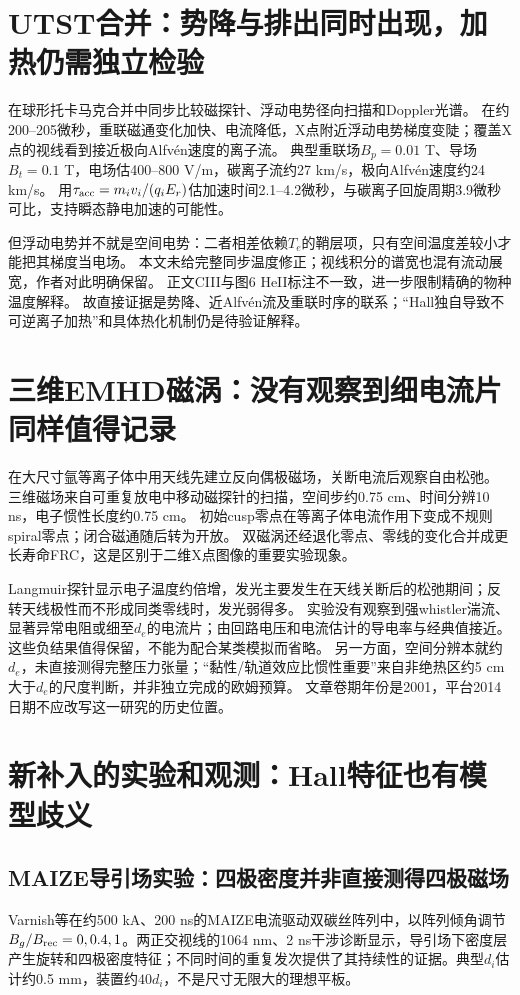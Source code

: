 \documentclass[UTF8,a4paper,11pt,openany,fontset=fandol]{ctexbook}
\begin{document}
\section{UTST合并：势降与排出同时出现，加热仍需独立检验}
\citet{L189}在球形托卡马克合并中同步比较磁探针、浮动电势径向扫描和Doppler光谱。
在约200--205微秒，重联磁通变化加快、电流降低，X点附近浮动电势梯度变陡；覆盖X点的视线看到接近极向Alfvén速度的离子流。
典型重联场$B_p=0.01$ T、导场$B_t=0.1$ T，电场估400--800 V/m，碳离子流约27 km/s，极向Alfvén速度约24 km/s。
用$\tau_{\rm acc}=m_iv_i/(q_iE_r)$估加速时间2.1--4.2微秒，与碳离子回旋周期3.9微秒可比，支持瞬态静电加速的可能性。

但浮动电势并不就是空间电势：二者相差依赖$T_e$的鞘层项，只有空间温度差较小才能把其梯度当电场。
本文未给完整同步温度修正；视线积分的谱宽也混有流动展宽，作者对此明确保留。
正文CIII与图6 HeII标注不一致，进一步限制精确的物种温度解释。
故直接证据是势降、近Alfvén流及重联时序的联系；“Hall独自导致不可逆离子加热”和具体热化机制仍是待验证解释。

\section{三维EMHD磁涡：没有观察到细电流片同样值得记录}
\citet{F766}在大尺寸氩等离子体中用天线先建立反向偶极磁场，关断电流后观察自由松弛。
三维磁场来自可重复放电中移动磁探针的扫描，空间步约0.75 cm、时间分辨10 ns，电子惯性长度约0.75 cm。
初始cusp零点在等离子体电流作用下变成不规则spiral零点；闭合磁通随后转为开放。
双磁涡还经退化零点、零线的变化合并成更长寿命FRC，这是区别于二维X点图像的重要实验现象。

Langmuir探针显示电子温度约倍增，发光主要发生在天线关断后的松弛期间；反转天线极性而不形成同类零线时，发光弱得多。
实验没有观察到强whistler湍流、显著异常电阻或细至$d_e$的电流片；由回路电压和电流估计的导电率与经典值接近。
这些负结果值得保留，不能为配合某类模拟而省略。
另一方面，空间分辨本就约$d_e$，未直接测得完整压力张量；“黏性/轨道效应比惯性重要”来自非绝热区约5 cm大于$d_e$的尺度判断，并非独立完成的欧姆预算。
文章卷期年份是2001，平台2014日期不应改写这一研究的历史位置。


\section{新补入的实验和观测：Hall特征也有模型歧义}
\subsection{MAIZE导引场实验：四极密度并非直接测得四极磁场}
Varnish等\citep{F703}在约500 kA、200 ns的MAIZE电流驱动双碳丝阵列中，以阵列倾角调节$B_g/B_{\rm rec}=0,0.4,1$。两正交视线的1064 nm、2 ns干涉诊断显示，导引场下密度层产生旋转和四极密度特征；不同时间的重复发次提供了其持续性的证据。典型$d_i$估计约0.5 mm，装置约$40d_i$，不是尺寸无限大的理想平板。
\end{document}
